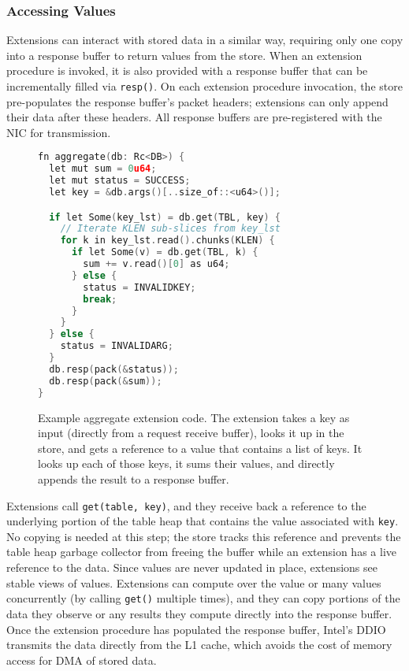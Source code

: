 \subsubsection{Accessing Values}
\label{sec:access}

Extensions can interact with stored data in a similar way, requiring only one
  copy into a response buffer to return values from the store.
When an extension procedure is invoked, it is also provided with a response
  buffer that can be incrementally filled via \texttt{resp()}.
On each extension procedure invocation, the store pre-populates the response
  buffer's packet headers; extensions can only append their data after these
  headers.
All response buffers are pre-registered with the NIC for transmission.

\begin{figure}[t]
\centering
\begin{lstlisting}[language=C++]
fn aggregate(db: Rc<DB>) {
  let mut sum = 0u64;
  let mut status = SUCCESS;
  let key = &db.args()[..size_of::<u64>()];

  if let Some(key_lst) = db.get(TBL, key) {
    // Iterate KLEN sub-slices from key_lst
    for k in key_lst.read().chunks(KLEN) {
      if let Some(v) = db.get(TBL, k) {
        sum += v.read()[0] as u64;
      } else {
        status = INVALIDKEY;
        break;
      }
    }
  } else {
    status = INVALIDARG;
  }
  db.resp(pack(&status));
  db.resp(pack(&sum));
}
\end{lstlisting}
\caption{Example aggregate extension code. The extension takes a key as
input (directly from a request receive buffer), looks it up in the
store, and gets a reference to a value that contains a list of keys. It
looks up each of those keys, it sums their values, and directly appends
the result to a response buffer.}
\label{lst:aggregate}
\end{figure}

Extensions call \texttt{get(table, key)}, and they receive back a reference to
  the underlying portion of the table heap that contains the value associated
  with \texttt{key}.
No copying is needed at this step; the store tracks this reference and prevents the table
  heap garbage collector from freeing the buffer while an extension has a live
  reference to the data.
Since values are never updated in place, extensions see stable views of values.
Extensions can compute over the value or many values concurrently (by calling \texttt{get()} multiple times), and they can
  copy portions of the data they observe or any results they compute directly into
  the response buffer.
Once the extension procedure has populated the response buffer, Intel's
  DDIO~\cite{ddio} transmits the data directly from the L1 cache, which avoids
  the cost of memory access for DMA of stored data.

